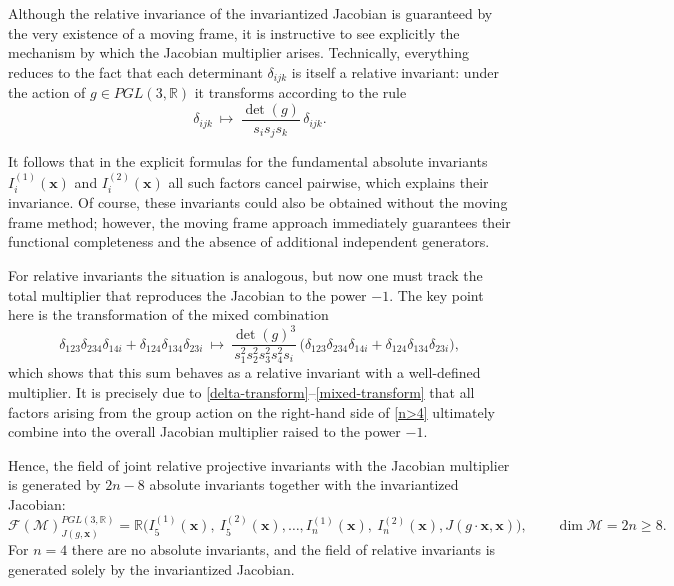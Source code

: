 \documentclass[12pt,reqno]{amsart}
\begin{document}
\medskip

Although the relative invariance of the invariantized Jacobian is guaranteed by the very existence of a moving frame,
it is instructive to see explicitly the mechanism by which the Jacobian multiplier arises.
Technically, everything reduces to the fact that each determinant $\delta_{ijk}$ is itself a relative invariant: under the action of
$g \in PGL(3,\mathbb{R})$ it transforms according to the rule
\begin{equation}\label{delta-transform}
\delta_{ijk}\ \longmapsto\ \frac{\det(g)}{s_i s_j s_k}\,\delta_{ijk}.
\end{equation}

It follows that in the explicit formulas for the fundamental absolute invariants
$I^{(1)}_i(\boldsymbol{x})$ and $I^{(2)}_i(\boldsymbol{x})$
all such factors cancel pairwise, which explains their invariance.
Of course, these invariants could also be obtained without the moving frame method;
however, the moving frame approach immediately guarantees their functional completeness
and the absence of additional independent generators.

For relative invariants the situation is analogous, but now one must track the total multiplier
that reproduces the Jacobian to the power $-1$.
The key point here is the transformation of the mixed combination
\begin{equation}\label{mixed-transform}
\delta_{123}\delta_{234}\delta_{14i}+\delta_{124}\delta_{134}\delta_{23i}
\ \longmapsto\
\frac{\det(g)^3}{s_1^2 s_2^2 s_3^2 s_4^2 s_i}\,
\bigl(\delta_{123}\delta_{234}\delta_{14i}+\delta_{124}\delta_{134}\delta_{23i}\bigr),
\end{equation}
which shows that this sum behaves as a relative invariant with a well-defined multiplier.
It is precisely due to \eqref{delta-transform}--\eqref{mixed-transform} that all factors arising
from the group action on the right-hand side of \eqref{n>4} ultimately combine into the overall
Jacobian multiplier raised to the power $-1$.

\medskip

Hence, the field of joint relative projective invariants with the Jacobian multiplier is generated
by $2n-8$ absolute invariants together with the invariantized Jacobian:
$$
\mathcal F(\mathcal M)^{PGL(3,\mathbb{R})}_{J(g,\boldsymbol{x})}
=\mathbb{R}\bigl(
I^{(1)}_5(\boldsymbol{x}),\ I^{(2)}_5(\boldsymbol{x}),\ldots,
I^{(1)}_n(\boldsymbol{x}),\ I^{(2)}_n(\boldsymbol{x}),
J(g\!\cdot\!\boldsymbol{x},\boldsymbol{x})
\bigr),
\qquad \dim \mathcal M = 2n \ge 8.
$$
For $n=4$ there are no absolute invariants, and the field of relative invariants is generated solely
by the invariantized Jacobian.
\end{document}
